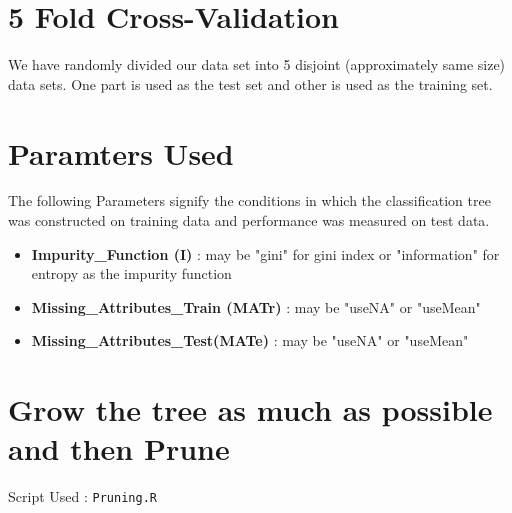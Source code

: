 \documentclass[12pt]{article}%
\begin{document}
\section{5 Fold Cross-Validation}
We have randomly divided our data set into 5 disjoint (approximately same size) data sets. 
One part is used as the test set and other is used as the training set. 

\section{Paramters Used}
The following Parameters signify the conditions in which the classification tree was constructed on training data and performance was measured on test data.
\begin{itemize}
\item {\bf Impurity\_Function (I) } : may be "gini" for gini index or "information" for entropy as the impurity function
\item {\bf Missing\_Attributes\_Train (MATr)} : may be "useNA" or "useMean"
\item {\bf Missing\_Attributes\_Test(MATe)} : may be "useNA" or "useMean"
\end{itemize}


\section{Grow the tree as much as possible and then Prune}
Script Used : {\tt Pruning.R} \\
\end{document}
